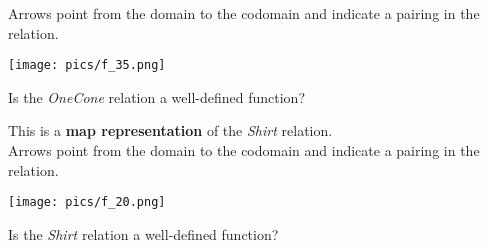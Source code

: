 \documentclass{ximera}
\begin{document}
\begin{exercise}
\begin{question}
Arrows point from the domain to the codomain and indicate a pairing in the relation.

\begin{image}
\texttt{[image: pics/f\_35.png]}
\end{image}

Is the \textit{OneCone} relation a well-defined function?

\begin{multipleChoice}
\end{multipleChoice}

\end{question}











\begin{question}

This is a \textbf{map representation} of the \textit{Shirt} relation. \\

Arrows point from the domain to the codomain and indicate a pairing in the relation.

\begin{image}
\texttt{[image: pics/f\_20.png]}
\end{image}

Is the \textit{Shirt} relation a well-defined function?

\begin{multipleChoice}
\end{multipleChoice}

\end{question}














\end{exercise}
\end{document}
